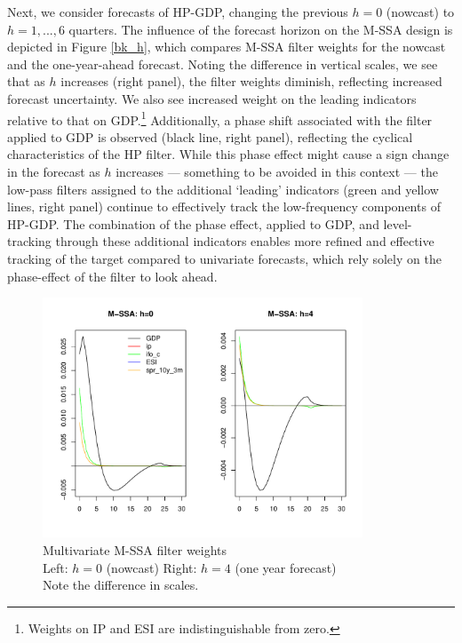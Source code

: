 \documentclass[11pt,a4paper]{article}
\begin{document}
Next, we 
consider forecasts of HP-GDP, changing the previous
$h=0$ (nowcast) to $h=1,...,6$ quarters. 
The influence of the forecast horizon on the M-SSA design is depicted in Figure \eqref{bk_h}, which compares M-SSA filter weights for the nowcast and the one-year-ahead forecast. Noting the difference in vertical scales, we see that as $h$ increases (right panel), the filter weights diminish, reflecting increased forecast uncertainty. We also see increased weight on the leading indicators relative to that on GDP.\footnote{Weights on IP and ESI are indistinguishable from zero.} Additionally, a phase shift associated with the filter applied to GDP is observed (black line, right panel), reflecting the cyclical characteristics of the HP filter. While this phase effect might cause a sign change in the forecast as $h$ increases — something to be avoided in this context — the low-pass filters assigned to the additional  `leading' indicators (green and yellow lines, right panel) continue to effectively track the low-frequency components of HP-GDP. The combination of the phase effect, applied to GDP, and level-tracking through these additional indicators enables more refined and effective tracking of the target compared to univariate forecasts, which rely solely on the phase-effect of the filter to look ahead.

\begin{figure}[H]
    \begin{center}
        \includegraphics[width=0.85\textwidth]{./Figures/bk_h.pdf}
        \caption{Multivariate M-SSA filter weights\\
        Left: $h=0$ (nowcast) \qquad Right: $h=4$ (one year forecast)\\
        Note the difference in scales.
        \label{bk_h}}
    \end{center}
\end{figure}
\end{document}
